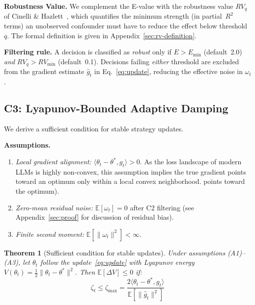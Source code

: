 \documentclass{article}
\newtheorem{theorem}{Theorem}
\begin{document}
\textbf{Robustness Value.} We complement the E-value with the
robustness value $RV_q$ of Cinelli \& Hazlett~\cite{cinelli2020},
which quantifies the minimum strength (in partial~$R^2$ terms) an
unobserved confounder must have to reduce the effect below
threshold~$q$. The formal definition is given in
Appendix~\ref{sec:rv-definition}.

\textbf{Filtering rule.} A decision is classified as \emph{robust}
only if $E > E_{\min}$ (default~2.0) \emph{and} $RV_q > RV_{\min}$
(default~0.1). Decisions failing \emph{either} threshold are
excluded from the gradient estimate $\hat{g}_t$ in
Eq.~\eqref{eq:update}, reducing the effective noise in $\omega_t$.


\subsection{C3: Lyapunov-Bounded Adaptive Damping}
\label{sec:lyapunov}

We derive a sufficient condition for stable strategy updates.

\textbf{Assumptions.}
\begin{enumerate}
  \item[(A1)] \emph{Local gradient alignment:}
    $\langle \theta_t - \theta^*, g_t \rangle > 0$. As the loss landscape of modern LLMs is highly non-convex, this assumption implies the true gradient points toward an optimum only within a local convex neighborhood.
    points toward the optimum).
  \item[(A2)] \emph{Zero-mean residual noise:}
    $\mathbb{E}[\omega_t] = 0$ after C2 filtering (see
    Appendix~\ref{sec:proof} for discussion of residual bias).
  \item[(A3)] \emph{Finite second moment:}
    $\mathbb{E}[\|\omega_t\|^2] < \infty$.
\end{enumerate}

\begin{theorem}[Sufficient condition for stable updates]
\label{thm:lyapunov}
Under assumptions (A1)--(A3), let $\theta_t$ follow the
update~\eqref{eq:update} with Lyapunov energy
$V(\theta_t) = \tfrac{1}{2}\|\theta_t - \theta^*\|^2$.
Then $\mathbb{E}[\Delta V] \leq 0$ if:
\begin{equation}
  \zeta_t \leq \zeta_{\max} = \frac{2\langle \theta_t - \theta^*,
    g_t \rangle}{\mathbb{E}[\|\hat{g}_t\|^2]}
  \label{eq:zeta_max}
\end{equation}
\end{theorem}
\end{document}
